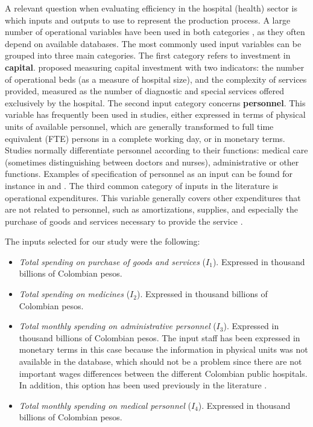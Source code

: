 \documentclass[11pt,a4paper,oneside]{article}
\begin{document}
A relevant question when evaluating efficiency in the hospital (health) sector is which inputs and outputs to use to represent the production process. A large number of operational variables have been used in both categories \citep{o2008cross}, as they often depend on available databases. The most commonly used input variables can be grouped into three main categories. The first category refers to investment in \textbf{capital}. \cite{Ozcan:1993vz} proposed measuring capital investment with two indicators: the number of operational beds (as a measure of hospital size), and the complexity of services provided, measured as the number of diagnostic and special services offered exclusively by the hospital. The second input category concerns \textbf{personnel}. This variable has frequently been used in studies, either expressed in terms of physical units of available personnel, which are generally transformed to full time equivalent (FTE) persons in a complete working day, or in monetary terms. Studies normally differentiate personnel according to their functions: medical care (sometimes distinguishing between doctors and nurses), administrative or other functions. Examples of specification of personnel as an input can be found for instance in \cite{Athanassopoulos:2001et} and \cite{Ozcan:1993vz}.  The third common category of inputs in the literature is operational expenditures. This variable generally covers other expenditures that are not related to personnel, such as amortizations, supplies, and especially the purchase of goods and services necessary to provide the service \citep{Ozcan:1993vz}.

The inputs selected for our study were the following:
%
\begin{itemize}[leftmargin=2cm]
	\item \textit{Total spending on purchase of goods and services} ($I_1$). Expressed in thousand billions of Colombian pesos. 
	\item \textit{Total spending on medicines} ($I_2$). Expressed in thousand billions of Colombian pesos. 
	\item \textit{Total monthly spending on administrative personnel} ($I_3$). Expressed in thousand billions of Colombian pesos. \color{blue}The input staff has been expressed in monetary terms in this case because the information in physical units was not available in the database, which should not be a problem since there are not important wages differences between the different Colombian public hospitals. In addition, this option has been used previously in the literature \citep{chirikos2000measuring,hofmarcher2002measuring,wan2002integration}. \color{black}
	\item \textit{Total monthly spending on medical personnel} ($I_4$). Expressed in thousand billions of Colombian pesos. 
\end{itemize}
\end{document}
